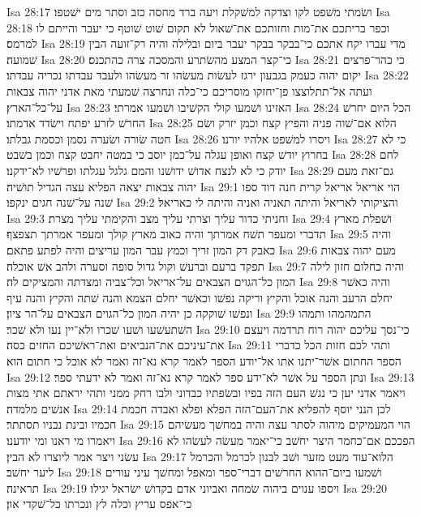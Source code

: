 Isa 28:17  ושׂמתי משׁפט לקו וצדקה למשׁקלת ויעה ברד מחסה כזב וסתר מים ישׁטפו׃
Isa 28:18  וכפר בריתכם את־מות וחזותכם את־שׁאול לא תקום שׁוט שׁוטף כי יעבר והייתם לו למרמס׃
Isa 28:19  מדי עברו יקח אתכם כי־בבקר בבקר יעבר ביום ובלילה והיה רק־זועה הבין שׁמועה׃
Isa 28:20  כי־קצר המצע מהשׂתרע והמסכה צרה כהתכנס׃
Isa 28:21  כי כהר־פרצים יקום יהוה כעמק בגבעון ירגז לעשׂות מעשׂהו זר מעשׂהו ולעבד עבדתו נכריה עבדתו׃
Isa 28:22  ועתה אל־תתלוצצו פן־יחזקו מוסריכם כי־כלה ונחרצה שׁמעתי מאת אדני יהוה צבאות על־כל־הארץ׃
Isa 28:23  האזינו ושׁמעו קולי הקשׁיבו ושׁמעו אמרתי׃
Isa 28:24  הכל היום יחרשׁ החרשׁ לזרע יפתח וישׂדד אדמתו׃
Isa 28:25  הלוא אם־שׁוה פניה והפיץ קצח וכמן יזרק ושׂם חטה שׂורה ושׂערה נסמן וכסמת גבלתו׃
Isa 28:26  ויסרו למשׁפט אלהיו יורנו׃
Isa 28:27  כי לא בחרוץ יודשׁ קצח ואופן עגלה על־כמן יוסב כי במטה יחבט קצח וכמן בשׁבט׃
Isa 28:28  לחם יודק כי לא לנצח אדושׁ ידושׁנו והמם גלגל עגלתו ופרשׁיו לא־ידקנו׃
Isa 28:29  גם־זאת מעם יהוה צבאות יצאה הפליא עצה הגדיל תושׁיה׃
Isa 29:1  הוי אריאל אריאל קרית חנה דוד ספו שׁנה על־שׁנה חגים ינקפו׃
Isa 29:2  והציקותי לאריאל והיתה תאניה ואניה והיתה לי כאריאל׃
Isa 29:3  וחניתי כדור עליך וצרתי עליך מצב והקימתי עליך מצרת׃
Isa 29:4  ושׁפלת מארץ תדברי ומעפר תשׁח אמרתך והיה כאוב מארץ קולך ומעפר אמרתך תצפצף׃
Isa 29:5  והיה כאבק דק המון זריך וכמץ עבר המון עריצים והיה לפתע פתאם׃
Isa 29:6  מעם יהוה צבאות תפקד ברעם וברעשׁ וקול גדול סופה וסערה ולהב אשׁ אוכלה׃
Isa 29:7  והיה כחלום חזון לילה המון כל־הגוים הצבאים על־אריאל וכל־צביה ומצדתה והמציקים לה׃
Isa 29:8  והיה כאשׁר יחלם הרעב והנה אוכל והקיץ וריקה נפשׁו וכאשׁר יחלם הצמא והנה שׁתה והקיץ והנה עיף ונפשׁו שׁוקקה כן יהיה המון כל־הגוים הצבאים על־הר ציון׃
Isa 29:9  התמהמהו ותמהו השׁתעשׁעו ושׁעו שׁכרו ולא־יין נעו ולא שׁכר׃
Isa 29:10  כי־נסך עליכם יהוה רוח תרדמה ויעצם את־עיניכם את־הנביאים ואת־ראשׁיכם החזים כסה׃
Isa 29:11  ותהי לכם חזות הכל כדברי הספר החתום אשׁר־יתנו אתו אל־יודע הספר לאמר קרא נא־זה ואמר לא אוכל כי חתום הוא׃
Isa 29:12  ונתן הספר על אשׁר לא־ידע ספר לאמר קרא נא־זה ואמר לא ידעתי ספר׃
Isa 29:13  ויאמר אדני יען כי נגשׁ העם הזה בפיו ובשׂפתיו כבדוני ולבו רחק ממני ותהי יראתם אתי מצות אנשׁים מלמדה׃
Isa 29:14  לכן הנני יוסף להפליא את־העם־הזה הפלא ופלא ואבדה חכמת חכמיו ובינת נבניו תסתתר׃
Isa 29:15  הוי המעמיקים מיהוה לסתר עצה והיה במחשׁך מעשׂיהם ויאמרו מי ראנו ומי יודענו׃
Isa 29:16  הפככם אם־כחמר היצר יחשׁב כי־יאמר מעשׂה לעשׂהו לא עשׂני ויצר אמר ליוצרו לא הבין׃
Isa 29:17  הלוא־עוד מעט מזער ושׁב לבנון לכרמל והכרמל ליער יחשׁב׃
Isa 29:18  ושׁמעו ביום־ההוא החרשׁים דברי־ספר ומאפל ומחשׁך עיני עורים תראינה׃
Isa 29:19  ויספו ענוים ביהוה שׂמחה ואביוני אדם בקדושׁ ישׂראל יגילו׃
Isa 29:20  כי־אפס עריץ וכלה לץ ונכרתו כל־שׁקדי און׃
